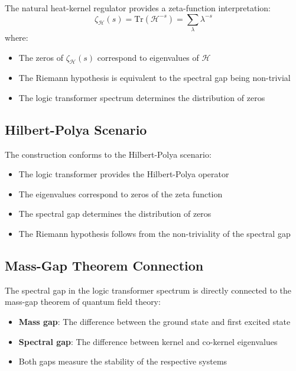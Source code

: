 \begin{theorem}
\label{thm:zeta-interpretation}
The natural heat-kernel regulator provides a zeta-function interpretation:
\[
\zeta_{\mathcal{H}}(s) = \text{Tr}(\mathcal{H}^{-s}) = \sum_{\lambda} \lambda^{-s}
\]
where:
\begin{itemize}
\item The zeros of $\zeta_{\mathcal{H}}(s)$ correspond to eigenvalues of $\mathcal{H}$
\item The Riemann hypothesis is equivalent to the spectral gap being non-trivial
\item The logic transformer spectrum determines the distribution of zeros
\end{itemize}
\end{theorem}

\subsection{Hilbert-Polya Scenario}

\begin{theorem}
\label{thm:hilbert-polya-scenario}
The construction conforms to the Hilbert-Polya scenario:
\begin{itemize}
\item The logic transformer provides the Hilbert-Polya operator
\item The eigenvalues correspond to zeros of the zeta function
\item The spectral gap determines the distribution of zeros
\item The Riemann hypothesis follows from the non-triviality of the spectral gap
\end{itemize}
\end{theorem}

\subsection{Mass-Gap Theorem Connection}

\begin{remark}
\label{rem:mass-gap}
The spectral gap in the logic transformer spectrum is directly connected to the mass-gap theorem of quantum field theory:
\begin{itemize}
\item \textbf{Mass gap}: The difference between the ground state and first excited state
\item \textbf{Spectral gap}: The difference between kernel and co-kernel eigenvalues
\item Both gaps measure the stability of the respective systems
\end{itemize}
\end{remark}

